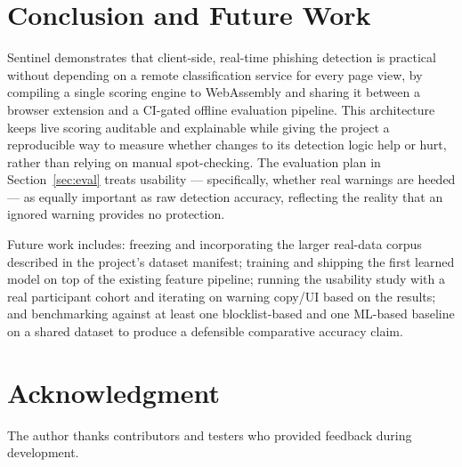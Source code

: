 \documentclass[conference]{IEEEtran}
\begin{document}
\section{Conclusion and Future Work}
Sentinel demonstrates that client-side, real-time phishing detection is practical without depending on a remote classification service for every page view, by compiling a single scoring engine to WebAssembly and sharing it between a browser extension and a CI-gated offline evaluation pipeline. This architecture keeps live scoring auditable and explainable while giving the project a reproducible way to measure whether changes to its detection logic help or hurt, rather than relying on manual spot-checking. The evaluation plan in Section~\ref{sec:eval} treats usability --- specifically, whether real warnings are heeded --- as equally important as raw detection accuracy, reflecting the reality that an ignored warning provides no protection.

Future work includes: freezing and incorporating the larger real-data corpus described in the project's dataset manifest; training and shipping the first learned model on top of the existing feature pipeline; running the usability study with a real participant cohort and iterating on warning copy/UI based on the results; and benchmarking against at least one blocklist-based and one ML-based baseline on a shared dataset to produce a defensible comparative accuracy claim.

\section*{Acknowledgment}
The author thanks contributors and testers who provided feedback during development.
\end{document}
